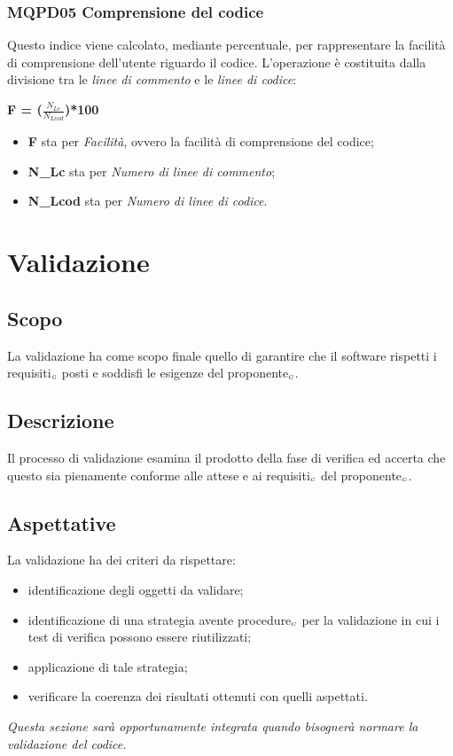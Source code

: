 \subsubsection{MQPD05 Comprensione del codice}\label{ProcessiDiSupportoVerificaMetricheMQPD05CompresioneDelCodice}
Questo indice viene calcolato, mediante percentuale, per rappresentare la facilità di comprensione dell'utente riguardo il codice.
L'operazione è costituita dalla divisione tra le \textit{linee di commento} e le \textit{linee di codice}:
\begin{center}
	\textbf{F = ($\frac{N_{Lc}}{N_{Lcod}}$)*100}
\end{center}
\begin{itemize}
	\item \textbf{F} sta per \textit{Facilità}, ovvero la facilità di comprensione del codice;
	\item \textbf{N\_Lc} sta per \textit{Numero di linee di commento};
	\item \textbf{N\_Lcod} sta per \textit{Numero di linee di codice}.
\end{itemize}

\section{Validazione} \label{ProcessiDiSupportoValidazione}
\subsection{Scopo} \label{ProcessiDiSupportoValidazioneScopo}
La validazione ha come scopo finale quello di garantire che il software rispetti i requisiti$_{\scaleto{G}{3pt}}$ posti e soddisfi le esigenze del proponente$_{\scaleto{G}{3pt}}$.
\subsection{Descrizione} \label{ProcessiDiSupportoValidazioneDescrizione}
Il processo di validazione esamina il prodotto della fase di verifica ed accerta che questo sia pienamente conforme alle attese e ai requisiti$_{\scaleto{G}{3pt}}$ del proponente$_{\scaleto{G}{3pt}}$. 
\subsection{Aspettative} \label{ProcessiDiSupportoValidazioneAspettative}
La validazione ha dei criteri da rispettare:
\begin{itemize}
	\item identificazione degli oggetti da validare;
	\item identificazione di una strategia avente procedure$_{\scaleto{G}{3pt}}$ per la validazione in cui i test di verifica possono essere riutilizzati;
	\item applicazione di tale strategia;
	\item verificare la coerenza dei risultati ottenuti con quelli aspettati.
\end{itemize}
\textit{Questa sezione sarà opportunamente integrata quando bisognerà normare la validazione del codice.}